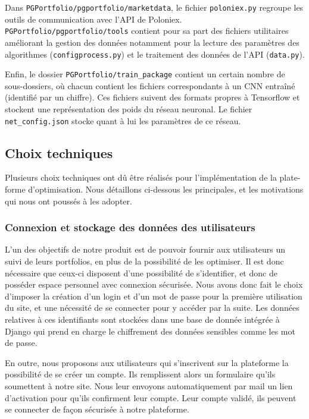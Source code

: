 \documentclass[a4paper, 10pt]{article}
\begin{document}
Dans \texttt{PGPortfolio/pgportfolio/marketdata}, le fichier \texttt{poloniex.py} regroupe les outils de communication avec l'API de Poloniex. \texttt{PGPortfolio/pgportfolio/tools} contient pour sa part des fichiers utilitaires améliorant la gestion des données notamment pour la lecture des paramètres des algorithmes (\texttt{configprocess.py}) et le traitement des données de l'API (\texttt{data.py}).

Enfin, le dossier \texttt{PGPortfolio/train\_package} contient un certain nombre de sous-dossiers, où chacun contient les fichiers correspondants à un CNN entraîné (identifié par un chiffre). Ces fichiers suivent des formats propres à Tensorflow et stockent une représentation des poids du réseau neuronal. Le fichier \texttt{net\_config.json} stocke quant à lui les paramètres de ce réseau.

\subsection{Choix techniques}
\label{sec:developpement_choix}

Plusieurs choix techniques ont dû être réalisés pour l'implémentation de la plate-forme d'optimisation. Nous détaillons ci-dessous les principales, et les motivations qui nous ont poussés à les adopter.

\subsubsection{Connexion et stockage des données des utilisateurs}
\label{sec:developpement_choix_stockage}

L'un des objectifs de notre produit est de pouvoir fournir aux utilisateurs un suivi de leurs portfolios, en plus de la possibilité de les optimiser. Il est donc nécessaire que ceux-ci disposent d'une possibilité de s'identifier, et donc de posséder espace personnel avec connexion sécurisée. Nous avons donc fait le choix d'imposer la création d'un login et d'un mot de passe pour la première utilisation du site, et une nécessité de se connecter pour y accéder par la suite. Les données relatives à ces identifiants sont stockées dans une base de donnée intégrée à Django qui prend en charge le chiffrement des données sensibles comme les mot de passe.

En outre, nous proposons aux utilisateurs qui s’inscrivent sur la plateforme la possibilité de se créer un compte. Ils remplissent alors un formulaire qu’ils soumettent à notre site. Nous leur envoyons automatiquement par mail un lien d’activation pour qu’ils confirment leur compte. Leur compte validé, ils peuvent se connecter de façon sécurisée à notre plateforme.
\end{document}
